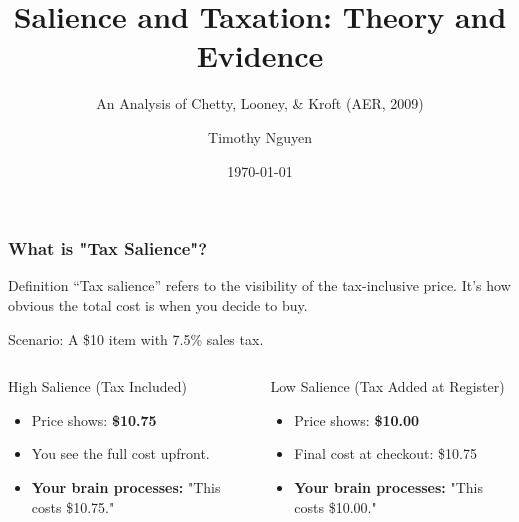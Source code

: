 \documentclass{beamer}
\title{Salience and Taxation: Theory and Evidence}
\subtitle{An Analysis of Chetty, Looney, \& Kroft (AER, 2009)}
\author{Timothy Nguyen}
\institute{EC323 - Professor Jawwad Noor}
\date{\today}
\begin{document}
\begin{frame}
  \titlepage
\end{frame}

\begin{frame}
  \frametitle{What is "Tax Salience"?}
  
  \begin{block}{Definition}
    ``Tax salience'' refers to the visibility of the tax-inclusive price. It's how obvious the total cost is when you decide to buy.
  \end{block}

  \pause %

  \begin{alertblock}{Scenario: A \$10 item with 7.5\% sales tax.}
  \end{alertblock}
  
  \begin{columns}[T] %
    
    \begin{column}{0.5\textwidth}
      \begin{block}{High Salience (Tax Included)}
        \begin{itemize}
          \item Price shows: \textbf{\$10.75}
          \item You see the full cost upfront.
          \item \textbf{Your brain processes:} "This costs \$10.75."
        \end{itemize}
      \end{block}
    \end{column}
    
    \begin{column}{0.5\textwidth}
      \begin{block}{Low Salience (Tax Added at Register)}
        \begin{itemize}
          \item Price shows: \textbf{\$10.00}
          \item Final cost at checkout: \$10.75
          \item \textbf{Your brain processes:} "This costs \$10.00."
        \end{itemize}
      \end{block}
    \end{column}
    
  \end{columns}
  
\end{frame}
\end{document}
